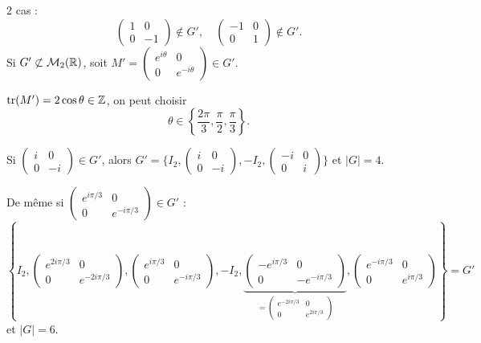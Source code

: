 \begin{solution}
2\ieme{} cas :
\[
\begin{pmatrix}1&0\\0&-1\end{pmatrix}\notin G',\quad
\begin{pmatrix}-1&0\\0&1\end{pmatrix}\notin G'.
\]
Si $G'\not\subset\mathcal M_2(\mathbb R)$, soit
$M'=\begin{pmatrix}e^{i\theta}&0\\0&e^{-i\theta}\end{pmatrix}\in G'$.

$\operatorname{tr}(M')=2\cos\theta\in\mathbb Z$, on peut choisir
\[
\theta\in\left\{\frac{2\pi}{3},\frac{\pi}{2},\frac{\pi}{3}\right\}.
\]

Si $\begin{pmatrix}i&0\\0&-i\end{pmatrix}\in G'$, alors
$G'=\{I_2,\begin{pmatrix}i&0\\0&-i\end{pmatrix},-I_2,
\begin{pmatrix}-i&0\\0&i\end{pmatrix}\}$ et $|G|=4$.

De même si $\begin{pmatrix}e^{i\pi/3}&0\\0&e^{-i\pi/3}\end{pmatrix}\in G'$ :
\[
\left\{
I_2,
\begin{pmatrix}e^{2i\pi/3}&0\\0&e^{-2i\pi/3}\end{pmatrix},
\begin{pmatrix}e^{i\pi/3}&0\\0&e^{-i\pi/3}\end{pmatrix},
-I_2,
\underbrace{
\begin{pmatrix}-e^{i\pi/3}&0\\0&-e^{-i\pi/3}\end{pmatrix}
}_{\displaystyle =\begin{pmatrix}e^{-2i\pi/3}&0\\0&e^{2i\pi/3}\end{pmatrix}},
\begin{pmatrix}e^{-i\pi/3}&0\\0&e^{i\pi/3}\end{pmatrix}
\right\}=G'
\]
et $|G|=6$.
\end{solution}


